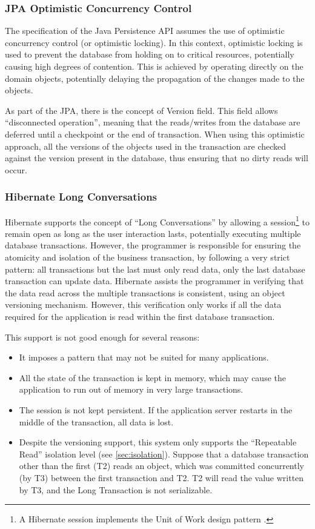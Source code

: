 \documentclass{llncs}
\begin{document}
\subsubsection{JPA Optimistic Concurrency Control}

The specification of the Java Persistence API assumes the use of
optimistic concurrency control (or optimistic locking). In this
context, optimistic locking is used to prevent the database from
holding on to critical resources, potentially causing high degrees of
contention.  This is achieved by operating directly on the domain
objects, potentially delaying the propagation of the changes made to
the objects.

As part of the JPA, there is the concept of Version field. This field
allows ``disconnected operation'', meaning that the reads/writes from
the database are deferred until a checkpoint or the end of
transaction. When using this optimistic approach, all the versions of
the objects used in the transaction are checked against the version
present in the database, thus ensuring that no dirty reads will occur.

\subsubsection{Hibernate Long Conversations}

Hibernate supports the concept of ``Long Conversations'' by allowing a
session\footnote{A Hibernate session implements the Unit of Work
  design pattern \cite{fowler2003patterns}.} to remain open as long as
the user interaction lasts, potentially executing multiple database
transactions. However, the programmer is responsible for ensuring the
atomicity and isolation of the business transaction, by following a
very strict pattern: all transactions but the last must only read
data, only the last database transaction can update data. Hibernate
assists the programmer in verifying that the data read across the
multiple transactions is consistent, using an object versioning
mechanism. However, this verification only works if all the data
required for the application is read within the first database
transaction.

This support is not good enough for several reasons:

\begin{itemize}
\item It imposes a pattern that may not be suited for many
  applications.
\item All the state of the transaction is kept in memory, which may
  cause the application to run out of memory in very large
  transactions.
\item The session is not kept persistent. If the application server
  restarts in the middle of the transaction, all data is lost.
\item Despite the versioning support, this system only supports the
  ``Repeatable Read'' isolation level (see
  \ref{sec:isolation}). Suppose that a database transaction other than
  the first (T2) reads an object, which was committed concurrently (by
  T3) between the first transaction and T2. T2 will read the value
  written by T3, and the Long Transaction is not serializable.
\end{itemize}
\end{document}
